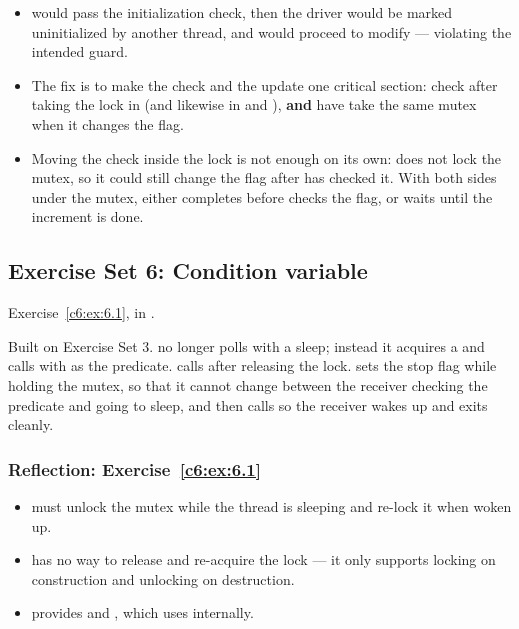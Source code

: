 \begin{itemize}
  \item {} would pass the initialization check, then the driver would be marked
    uninitialized by another thread, and  would proceed to modify 
    --- violating the intended guard.
  \item The fix is to make the check and the update one critical section: check
     after taking the lock in  (and likewise in
     and ), \textbf{and} have  take the same
    mutex when it changes the flag.
  \item Moving the check inside the lock is not enough on its own:  does not
    lock the mutex, so it could still change the flag after  has checked it. With
    both sides under the mutex,  either completes before
     checks the flag, or waits until the increment is done.
\end{itemize}

\subsection{Exercise Set 6: Condition variable}
\label{sol:set:c6.6}
Exercise~\ref{c6:ex:6.1}, in .

Built on Exercise Set 3.  no longer polls with a sleep; instead it acquires a
 and calls  with  as the predicate.
 calls  after releasing the lock.  sets the stop
flag while holding the mutex, so that it cannot change between the receiver checking the predicate
and going to sleep, and then calls  so the receiver wakes up and exits
cleanly.


\subsubsection{Reflection: Exercise~\ref{c6:ex:6.1}}
\begin{itemize}
  \item {} must unlock the mutex while the thread is sleeping and re-lock it when
    woken up.
  \item {} has no way to release and re-acquire the lock --- it only supports
    locking on construction and unlocking on destruction.
  \item {} provides  and , which 
    uses internally.
\end{itemize}


